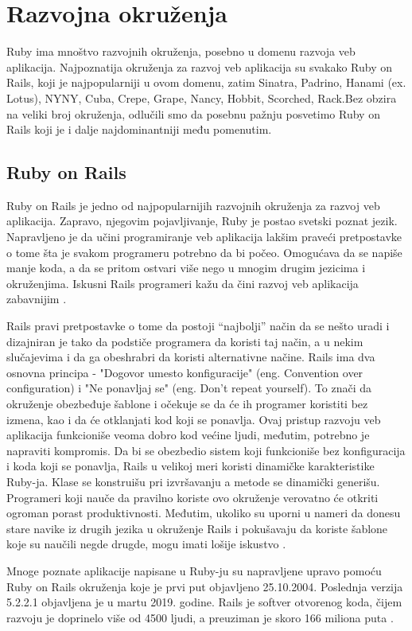 \documentclass[a4paper]{article}
\begin{document}
\section{Razvojna okruženja}
Ruby ima mnoštvo razvojnih okruženja, posebno u domenu razvoja veb aplikacija. Najpoznatija okruženja za razvoj veb aplikacija su svakako Ruby on Rails, koji je najpopularniji u ovom domenu, zatim Sinatra, Padrino, Hanami (ex. Lotus), NYNY, Cuba, Crepe, Grape, Nancy, Hobbit, Scorched, Rack.Bez obzira na veliki broj okruženja, odlučili smo da posebnu pažnju posvetimo Ruby on Rails koji je i dalje najdominantniji među pomenutim.
\subsection{Ruby on Rails}
Ruby on Rails je jedno od najpopularnijih razvojnih okruženja za razvoj veb aplikacija. Zapravo, njegovim pojavljivanje, Ruby je postao svetski poznat jezik. Napravljeno je da učini programiranje veb aplikacija lakšim praveći pretpostavke o tome šta je svakom programeru potrebno da bi počeo. Omogućava da se napiše manje koda, a da se pritom ostvari više nego u mnogim drugim jezicima i okruženjima. Iskusni Rails programeri kažu da čini razvoj veb aplikacija zabavnijim \cite{rubyOnRails}.

Rails pravi pretpostavke o tome da postoji “najbolji” način da se nešto uradi i dizajniran je tako da podstiče programera da koristi taj način, a u nekim slučajevima i da ga obeshrabri da koristi alternativne načine.  Rails ima dva osnovna principa - "Dogovor umesto konfiguracije" (eng. Convention over configuration) i "Ne ponavljaj se" (eng. Don't repeat yourself). To znači da okruženje obezbeđuje šablone i očekuje se da će ih programer koristiti bez izmena, kao i da će otklanjati kod koji se ponavlja. Ovaj pristup razvoju veb aplikacija funkcioniše veoma dobro kod većine ljudi, međutim, potrebno je napraviti kompromis. Da bi se obezbedio sistem koji funkcioniše bez konfiguracija i koda koji se ponavlja, Rails u velikoj meri koristi dinamičke karakteristike Ruby-ja. Klase se konstruišu pri izvršavanju a metode se dinamički generišu. Programeri koji nauče da pravilno koriste ovo okruženje verovatno će otkriti ogroman porast produktivnosti. Međutim, ukoliko su uporni u nameri da donesu stare navike iz drugih jezika u okruženje Rails i pokušavaju da koriste šablone koje su naučili negde drugde, mogu imati lošije iskustvo \cite{rubyOnRails}\cite{specDynTech}.


Mnoge poznate aplikacije napisane u Ruby-ju su napravljene upravo pomoću Ruby on Rails okruženja koje je prvi put objavljeno 25.10.2004. Poslednja verzija 5.2.2.1 objavljena je u martu 2019. godine. Rails je softver otvorenog koda, čijem razvoju je doprinelo više od 4500 ljudi, a preuziman je skoro 166 miliona puta \cite{rubyToolbox}.
\end{document}
